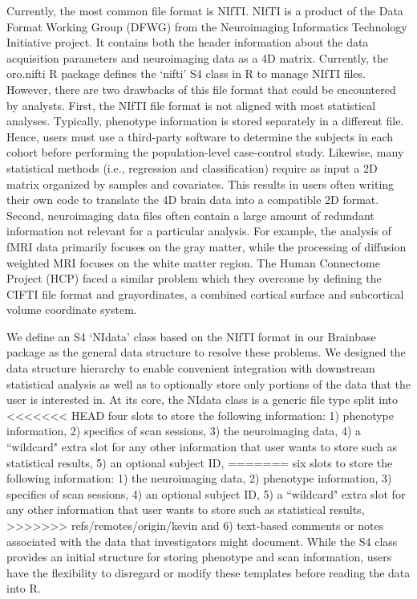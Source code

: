 \documentclass{nature}
\begin{document}
Currently, the most common file format is NIfTI.
NIfTI is a product of the Data Format Working Group
(DFWG) from the Neuroimaging Informatics Technology Initiative project. It
contains both the header information about the data acquisition
parameters and neuroimaging data as a 4D matrix.
Currently, the oro.nifti R package defines the `nifti'
S4 class in R to manage NIfTI files. However, there are two drawbacks
of this file format that could be encountered by analysts. 
First, the NIfTI file format is not aligned with
most statistical analyses. Typically,
phenotype information is stored separately in a different file. Hence, users must use a third-party software to determine the subjects in each cohort before performing the population-level case-control study. Likewise, many
statistical
methods (i.e., regression and classification) require as input a 2D matrix organized by samples and covariates. This results in users often writing 
their own code to translate the 4D brain data 
into a compatible 2D format.
Second, neuroimaging
data files often contain a large amount of
redundant information not relevant for a particular
analysis.
For example,
the analysis of fMRI data primarily focuses on the gray matter, while the
processing of diffusion weighted MRI focuses on the white matter region. The Human Connectome Project (HCP) faced a similar problem which they
overcome by defining the
CIFTI
file format and grayordinates, a combined cortical surface and subcortical
volume coordinate system\cite{Glasser2013The}. 


We define an S4 `NIdata' class based on the NIfTI format
in our Brainbase package as
the general data structure to resolve these problems. We designed
the data structure hierarchy to enable convenient integration with
downstream
statistical analysis as well as to optionally store only portions of the
data that the user is interested in.
At its core, the NIdata class is a generic file type split into
<<<<<<< HEAD
four slots to store the following information: 1) phenotype
information, 2) specifics of scan sessions, 3) the neuroimaging data,
4) a ``wildcard" extra slot for any other information that user
wants to store such as statistical results, 5) an optional subject ID,
=======
six slots to store the following information: 1) the neuroimaging data,
2) phenotype
information, 3) specifics of scan sessions,  4) an optional subject ID,
5) a ``wildcard" extra slot for any other information that user
wants to store such as statistical results,
>>>>>>> refs/remotes/origin/kevin
and 6) text-based comments or notes associated with the data that
investigators might document. While the
S4 class provides an initial structure for storing
phenotype and scan information, users have the flexibility to disregard or
modify these templates before reading the data into R.
\end{document}

